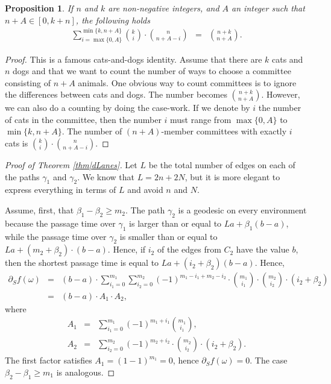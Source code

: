 \documentclass[reqno]{amsart}
\newtheorem{proposition}[theorem]{Proposition}
\begin{document}
\begin{appendix}
\begin{proposition}
If $n$ and $k$ are non-negative integers, and $A$ an integer such that $n+A\in[0,k+n]$, the following holds
\begin{eqnarray}
\sum_{i=\max\{0,A\}}^{\min\{k,n+A\}} \binom ki\cdot\binom{n}{n+A-i}&=&\binom{n+k}{n+A}. \label{eqn|CatsAndDogs}
\end{eqnarray}
\end{proposition}

\begin{proof}
This is a famous cats-and-dogs identity. Assume that there are $k$ cats and $n$ dogs and that we want to count the number of ways to choose a committee consisting of $n+A$ animals. One obvious way to count committees is to ignore the differences between cats and dogs. The number becomes $\binom{n+k}{n+A}$. However, we can also do a counting by doing the case-work. If we denote by $i$ the number of cats in the committee, then the number $i$ must range from $\max\{0,A\}$ to $\min\{k,n+A\}$. The number of $(n+A)$-member committees with exactly $i$ cats is $\binom ki\cdot \binom{n}{n+A-i}$. 
\end{proof}
 
 
 \begin{proof}[Proof of Theorem \ref{thm|dLanes}]
Let $L$ be the total number of edges on each of the paths $\gamma_1$ and $\gamma_2$. We know that $L=2n+2N$, but it is more elegant to express everything in terms of $L$ and avoid $n$ and $N$. 

Assume, first, that $\beta_1-\beta_2\geq m_2$. The path $\gamma_2$ is a geodesic on every environment because 
the passage time over $\gamma_1$ is larger than or equal to $La+\beta_1(b-a)$, while the passage time over $\gamma_2$ is smaller than or equal to 
$La+(m_2+\beta_2)\cdot(b-a)$. Hence, if $i_2$ of the edges from $C_2$ have the value $b$, then the shortest passage time is equal to $La+(i_2+\beta_2)(b-a)$. 
Hence, \begin{eqnarray*}
\partial_Sf(\omega)&=&(b-a)\cdot \sum_{i_1=0}^{m_1}\sum_{i_2=0}^{m_2}(-1)^{m_1-i_1+m_2-i_2}\cdot \binom{m_1}{i_1}\cdot \binom{m_2}{i_2}\cdot (i_2+\beta_2)\\
&=&(b-a)\cdot A_1 \cdot A_2,
\end{eqnarray*}
where
\begin{eqnarray*}
A_1&=&\sum_{i_1=0}^{m_1}(-1)^{m_1+i_1}\binom{m_1}{i_1},\\
A_2&=&\sum_{i_2=0}^{m_2}(-1)^{m_2+i_2}\cdot \binom{m_2}{i_2}\cdot(i_2+\beta_2).
\end{eqnarray*}
The first factor satisfies $A_1=(1-1)^{m_1}=0$, hence $\partial_Sf(\omega)=0$. The case $\beta_2-\beta_1\geq m_1$ is analogous.


\end{proof}
\end{appendix}
\end{document}
